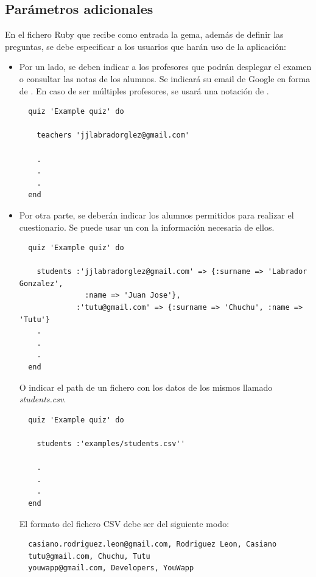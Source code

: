 \subsection{Par\'ametros adicionales}
\label{subsec:Apendice2.12}

En el fichero Ruby que recibe como entrada la gema, adem\'as de definir las preguntas, se debe especificar a los usuarios que har\'an
uso de la aplicaci\'on:

\begin{itemize}
  \item Por un lado, se deben indicar a los profesores que podr\'an desplegar el examen o consultar las notas de los alumnos. Se indicar\'a
  su email de Google en forma de . En caso de ser m\'ultiples profesores, se usar\'a una notaci\'on de . 
  \begin{verbatim}
  quiz 'Example quiz' do
    
    teachers 'jjlabradorglez@gmail.com'
    
    .
    .
    .
  end
  \end{verbatim}
  
  \item Por otra parte, se deber\'an indicar los alumnos permitidos para realizar el cuestionario. Se puede usar un  con 
  la informaci\'on necesaria de ellos. 
  \begin{verbatim}
  quiz 'Example quiz' do
    
    students :'jjlabradorglez@gmail.com' => {:surname => 'Labrador Gonzalez', 
               :name => 'Juan Jose'}, 
             :'tutu@gmail.com' => {:surname => 'Chuchu', :name => 'Tutu'}
    .
    .
    .
  end
  \end{verbatim}
  
  O indicar el path de un fichero  con los datos de los mismos llamado \textit{students.csv}.
  \begin{verbatim}
  quiz 'Example quiz' do
    
    students :'examples/students.csv''
    
    .
    .
    .
  end
  \end{verbatim}
  
  El formato del fichero CSV debe ser del siguiente modo:
  \begin{verbatim}
  casiano.rodriguez.leon@gmail.com, Rodriguez Leon, Casiano
  tutu@gmail.com, Chuchu, Tutu
  youwapp@gmail.com, Developers, YouWapp
  \end{verbatim}
  
\end{itemize}

